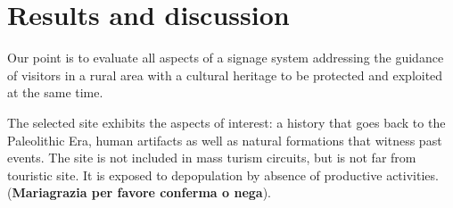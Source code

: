 \documentclass[sustainability,article,submit,pdftex,moreauthors]{Definitions/mdpi}
\begin{document}







\section{Results and discussion \label{sec:results}}

Our point is to evaluate all aspects of a signage system addressing the guidance of visitors in a rural area with a cultural heritage to be protected and exploited at the same time.

The selected site exhibits the aspects of interest: a history that goes back to the Paleolithic Era, human artifacts as well as natural formations that witness past events. The site is not included in mass turism circuits, but is not far from touristic site. It is exposed to depopulation by absence of productive activities. ({\bf Mariagrazia per favore conferma o nega}).
\end{document}
